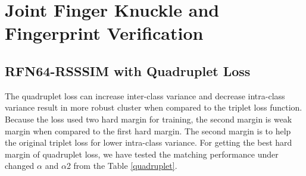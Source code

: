 \section{Joint Finger Knuckle and Fingerprint Verification}
\subsection{RFN64-RSSSIM with Quadruplet Loss}
The quadruplet loss can increase inter-class variance and decrease  intra-class variance result in more robust cluster when compared to the triplet loss function. Because the loss used two hard margin for training, the second margin is weak margin when compared to the first hard margin. The second margin is to help the original triplet loss for lower intra-class variance. For getting the best hard margin of quadruplet loss, we have tested the matching performance under changed $\alpha$ and $\alpha$2 from the Table \ref{quadruplet}.

